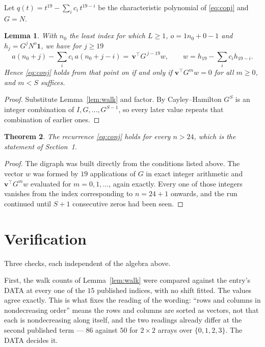 \documentclass[11pt,a4paper]{article}
\theoremstyle{plain}
\newtheorem{theorem}{Theorem}
\newtheorem{lemma}[theorem]{Lemma}
\theoremstyle{definition}
\begin{document}
Let $q(t)=t^{19}-\sum_i c_i\,t^{19-i}$ be the characteristic polynomial of
\eqref{eq:conj} and $G=N$.

\begin{lemma}\label{lem:crit}
With $n_0$ the least index for which $L\ge1$, $o=1n_0+0-1$ and
$h_j=G^{j}N^{o}\mathbf{1}$, we have for $j\ge19$
\[
a(n_0+j)-\sum_i c_i\,a(n_0+j-i)=\,\mathbf{v}^{\!\top}G^{\,j-19}w,
\qquad w=h_{19}-\sum_i c_ih_{19-i} .
\]
Hence \eqref{eq:conj} holds from that point on if and only if
$\mathbf{v}^{\!\top}G^{m}w=0$ for all $m\ge0$, and $m<S$ suffices.
\end{lemma}

\begin{proof}
Substitute Lemma~\ref{lem:walk} and factor. By Cayley--Hamilton $G^{S}$ is an integer
combination of $I,G,\dots,G^{S-1}$, so every later value repeats that combination of
earlier ones.
\end{proof}

\begin{theorem}
The recurrence \eqref{eq:conj} holds for every $n>24$, which is the statement of
Section~1.
\end{theorem}

\begin{proof}
The digraph was built directly from the conditions listed above. The vector $w$ was formed by
$19$ applications of $G$ in exact integer arithmetic and $\mathbf{v}^{\!\top}G^{m}w$
evaluated for $m=0,1,\dots$, again exactly. Every one of those integers vanishes from the
index corresponding to $n=24+1$ onwards, and the run continued until $S+1$ consecutive
zeros had been seen.
\end{proof}

\section{Verification}

Three checks, each independent of the algebra above.

First, the walk counts of Lemma~\ref{lem:walk} were compared against the entry's DATA at
every one of the $15$ published indices, with no shift fitted. The values agree exactly.
This is what fixes the reading of the wording: ``rows and columns in nondecreasing order''
means the rows and columns are sorted as vectors, not that each is nondecreasing along
itself, and the two readings already differ at the second published term --- $86$ against
$50$ for $2\times2$ arrays over $\{0,1,2,3\}$. The DATA decides it.
\end{document}
